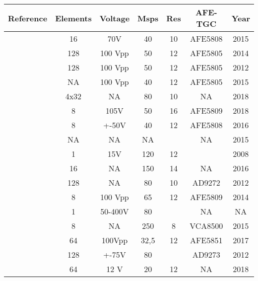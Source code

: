  
\begin{table}[H]
\centering
\begin{tabular}{l|c|c|c|c|c|c}
\textbf{Reference}                               & \textbf{Elements} & \textbf{Voltage} & \textbf{Msps} & \textbf{Res} & \textbf{AFE-TGC}    & \textbf{Year}   \\ \hline
\cite{ahn_smartphone-based_2015}    & 16          & 70V     & 40   & 10   & AFE5808 & 2015 \\
\cite{assef_compact_2014}      & 128         & 100 Vpp & 50   & 12   & AFE5805 & 2014 \\
\cite{assef_design_2012}       & 128         & 100 Vpp & 50   & 12   & AFE5805 & 2012 \\
\cite{assef_flexible_2015}          & NA          & 100 Vpp & 40   & 12   & AFE5805 & 2015\\
\cite{batbayar_hardware_2018}     & 4x32        & NA      & 80   & 10   & NA      & 2018 \\
\cite{bharath_compact_2018}  & 8           & 105V    & 50   & 16   & AFE5809 & 2018 \\
\cite{bharath_novel_2016}     & 8           & +-50V   & 40   & 12   & AFE5808 & 2016 \\
\cite{bharath_portable_2015}      & NA          & NA      & NA   &      & NA      & 2015 \\
\cite{chang-hong_hu_design_2008}   & 1           & 15V     & 120  & 12   &         & 2008 \\
\cite{chatar_analysis_2016}        & 16          & NA      & 150  & 14   & NA      & 2016 \\
\cite{cheung_multi-channel_2012} & 128         & NA      & 80   & 10   & AD9272  & 2012 \\
\cite{dusa_low_2014}             & 8           & 100 Vpp & 65   & 12   & AFE5809 & 2014 \\
\cite{fritsch_full_nodate}          & 1           & 50-400V & 80   &      & NA      & NA \\
\cite{govindan_reconfigurable_2015} & 8           & NA      & 250  & 8    & VCA8500 & 2015 \\
\cite{hager_ultralight:_2017} & 64          & 100Vpp  & 32,5 & 12   & AFE5851 & 2017 \\
\cite{hewener_highly_2012}      & 128         & +-75V   & 80   &      & AD9273  & 2012 \\
 \cite{ibrahim_towards_2018}     & 64          & 12 V    & 20   & 12   & NA      & 2018 \\

\end{tabular}
\end{table}
